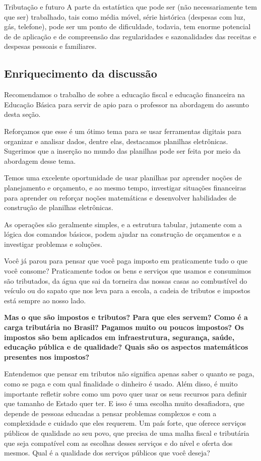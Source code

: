 \begin{paginatexto}{Tributação e futuro}
A parte da estatística que pode ser (não necessariamente tem que ser) trabalhado, tais como média móvel, série histórica (despesas com luz, gás, telefone), pode ser um ponto de dificuldade, todavia, tem enorme potencial de de aplicação e de compreensão das regularidades e sazonalidades das receitas e despesas pessoais e familiares.

\subsection*{Enriquecimento da discussão}

Recomendamos o trabalho de \cite{dias2018} sobre a educação fiscal e educação financeira na Educação Básica para servir de apio para o professor na abordagem do assunto desta seção.

Reforçamos que esse é um ótimo tema para se usar ferramentas digitais para organizar e analisar dados, dentre elas, destacamos planilhas eletrônicas. Sugerimos que a inserção no mundo das planilhas pode ser feita por meio da abordagem desse tema.

Temos uma excelente oportunidade de usar planilhas par aprender noções de planejamento e orçamento, e ao mesmo tempo, investigar situações financeiras para aprender ou reforçar noções matemáticas e desenvolver habilidades de construção de planilhas eletrônicas.

As operações são geralmente simples, e a estrutura tabular, jutamente com a lógica dos comandos básicos, podem ajudar na construção de orçamentos e a investigar problemas e soluções.
\end{paginatexto}
\label{fin-exp-8}

Você já parou para pensar que você paga imposto em praticamente tudo o que você consome? Praticamente todos os bens e serviços que usamos e consumimos são tributados, da água que sai da torneira das nossas casas ao combustível do veículo ou do sapato que nos leva para a escola, a cadeia de tributos e impostos está sempre ao nosso lado.

\textbf{Mas o que são impostos e tributos? Para que eles servem? Como é a carga tributária no Brasil? Pagamos muito ou poucos impostos? Os impostos são bem aplicados em infraestrutura, segurança, saúde, educação pública e de qualidade? Quais são os aspectos matemáticos presentes nos impostos?}

Entendemos que pensar em tributos não significa apenas saber o quanto se paga, como se paga e com qual finalidade o dinheiro é usado. Além disso, é muito importante refletir sobre como um povo quer usar os seus recursos para definir que tamanho de Estado quer ter. E isso é uma escolha muito desafiadora, que depende de pessoas educadas a pensar problemas complexos e com a complexidade e cuidado que eles requerem. Um país forte, que oferece serviços públicos de qualidade ao seu povo, que precisa de uma malha fiscal e tributária que seja compatível com as escolhas desses serviços e do nível e oferta dos mesmos. Qual é a qualidade dos serviços públicos que você deseja?

